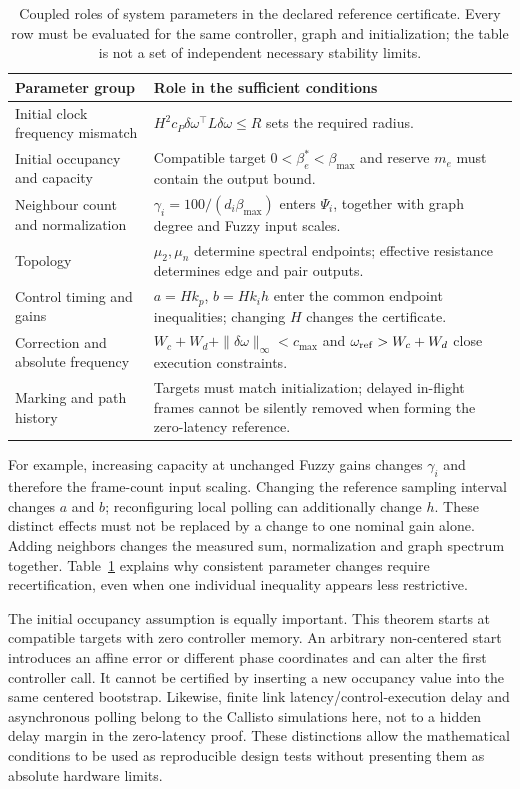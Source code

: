 \begin{table}[t]
\caption{Coupled roles of system parameters in the declared reference certificate.
Every row must be evaluated for the same controller, graph and initialization;
the table is not a set of independent necessary stability limits.}
\label{tab:parameter_roles}
\centering
\begin{tabular}{@{}lp{}@{}}\toprule
Parameter group & Role in the sufficient conditions\\\midrule
Initial clock frequency mismatch & $H^2c_P\delta\omega^\top L\delta\omega\le R$ sets the required radius.\\
Initial occupancy and capacity & Compatible target $0<\beta_e^*<\beta_{\max}$ and reserve $m_e$ must contain the output bound.\\
Neighbour count and normalization & $\gamma_i=100/(d_i\beta_{\max})$ enters $\Psi_i$, together with graph degree and Fuzzy input scales.\\
Topology & $\mu_2,\mu_n$ determine spectral endpoints; effective resistance determines edge and pair outputs.\\
Control timing and gains & $a=Hk_p$, $b=Hk_ih$ enter the common endpoint inequalities; changing $H$ changes the certificate.\\
Correction and absolute frequency & $W_c+W_d+\|\delta\omega\|_\infty<c_{\max}$ and $\omega_{\rm ref}>W_c+W_d$ close execution constraints.\\
Marking and path history & Targets must match initialization; delayed in-flight frames cannot be silently removed when forming the zero-latency reference.\\\bottomrule
\end{tabular}
\end{table}

For example, increasing capacity at unchanged Fuzzy gains changes
$\gamma_i$ and therefore the frame-count input scaling. Changing
the reference sampling interval changes $a$ and $b$; reconfiguring
local polling can additionally change $h$. These distinct effects
must not be replaced by a change to one nominal gain alone. Adding neighbors
changes the measured sum, normalization and graph spectrum together.
Table~\ref{tab:parameter_roles} explains why consistent parameter
changes require recertification, even when one individual inequality
appears less restrictive.

The initial occupancy assumption is equally important. This theorem
starts at compatible targets with zero controller memory. An arbitrary
non-centered start introduces an affine error or different phase
coordinates and can alter the first controller call. It cannot be
certified by inserting a new occupancy value into the same centered
bootstrap. Likewise, finite link latency/control-execution delay and asynchronous
polling belong to the Callisto simulations here, not to a hidden
delay margin in the zero-latency proof. These distinctions allow the
mathematical conditions to be used as reproducible design tests
without presenting them as absolute hardware limits.

